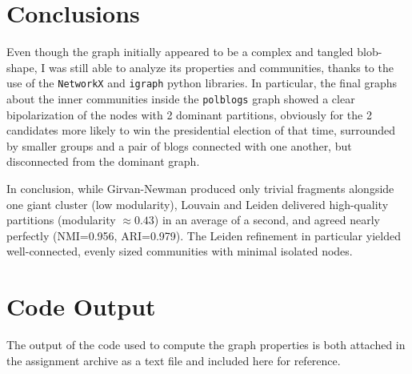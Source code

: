 \documentclass{article}
\begin{document}
\section{Conclusions}\label{sec:conclusions}
Even though the graph initially appeared to be a complex and tangled blob-shape, I was still able to analyze its properties and communities, thanks to the use of the \texttt{NetworkX} and \texttt{igraph} python libraries.
In particular, the final graphs about the inner communities inside the \texttt{polblogs} graph showed a clear bipolarization of the nodes with 2 dominant partitions, obviously for the 2 candidates more likely to win the presidential election of that time, surrounded by smaller groups and a pair of blogs connected with one another, but disconnected from the dominant graph.

In conclusion, while Girvan-Newman produced only trivial fragments alongside one giant cluster (low modularity), Louvain and Leiden delivered high-quality partitions (modularity \(\approx0.43\)) in an average of a second, and agreed nearly perfectly (NMI=0.956, ARI=0.979). 
The Leiden refinement in particular yielded well-connected, evenly sized communities with minimal isolated nodes.


\appendix
\section{Code Output}\label{sec:appendix-output}
The output of the code used to compute the graph properties is both attached in the assignment archive as a text file and included here  for reference. 

% 
\end{document}
